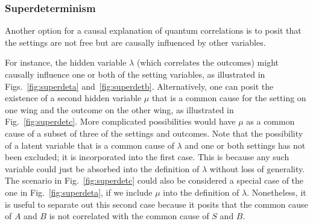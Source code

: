 \documentclass[12pt,onecolumn,nofootinbib]{revtex4-2}
\begin{document}
\subsubsection{Superdeterminism}

Another option for a causal explanation of quantum correlations is to posit that the settings are not free but are causally influenced by other variables.

For instance, the hidden variable $\lambda$ (which correlates the outcomes) might causally influence one or both of the setting variables, as illustrated in Figs.~\ref{fig:superdeta} and~\ref{fig:superdetb}. Alternatively, one can posit the existence of a second hidden variable $\mu$ that is a common cause for the setting on one wing and the outcome on the other wing, as illustrated in Fig.~\ref{fig:superdetc}.  More complicated possibilities would have $\mu$ as a common cause of a subset of three of the settings and outcomes.
Note that the possibility of a latent variable that is a common cause of $\lambda$ and one or both settings has not been excluded; it is incorporated into the first case.  This is because any such variable could just be absorbed into the definition of $\lambda$ without loss of generality.
The scenario in Fig.~\ref{fig:superdetc} could also be considered a special case of the one in Fig.~\ref{fig:superdeta}, if we include $\mu$ into the definition of $\lambda$.  Nonetheless, it is useful to separate out this second case because it posits that the common cause of $A$ and $B$ is not correlated with the common cause of $S$ and $B$.
\end{document}
